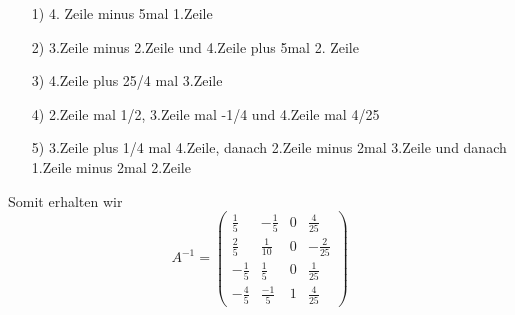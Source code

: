 \begin{itemize}
\item[1)] 4. Zeile minus 5mal 1.Zeile 
\item[2)] 3.Zeile minus 2.Zeile und 4.Zeile plus 5mal 2. Zeile
\item[3)] 4.Zeile plus 25/4 mal 3.Zeile
\item[4)] 2.Zeile mal 1/2, 3.Zeile mal -1/4 und 4.Zeile mal 4/25
\item[5)] 3.Zeile plus 1/4 mal 4.Zeile, danach 2.Zeile minus 2mal 3.Zeile und danach 1.Zeile minus 2mal 2.Zeile
\end{itemize}

Somit erhalten wir
$$
A^{-1}=\begin{pmatrix}\frac{1}{5}&-\frac{1}{5}&0&\frac{4}{25}  \\ \frac{2}{5}&\frac{1}{10}&0&-\frac{2}{25} \\  -\frac{1}{5}&\frac{1}{5}&0&\frac{1}{25} \\ -\frac{4}{5}&\frac{-1}{5}&1&\frac{4}{25}\end{pmatrix}
$$
%
%
%
%

